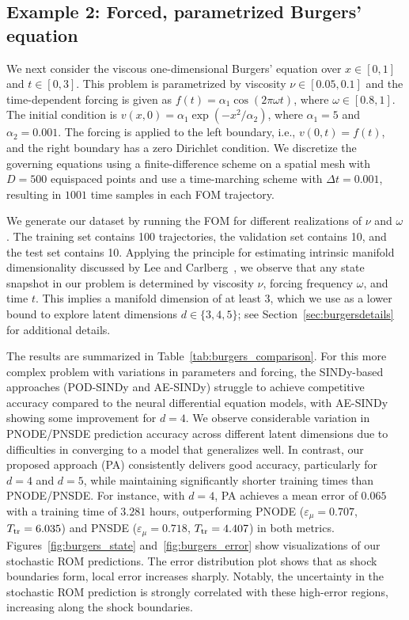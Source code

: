 \documentclass{article}
\begin{document}
	\subsection*{Example 2: Forced, parametrized Burgers' equation}
	
	We next consider the viscous one-dimensional Burgers' equation over $x\in [0, 1]$ and $t\in [0, 3]$. This problem is parametrized by viscosity $\nu \in [0.05,0.1]$ and the time-dependent forcing is given as $f(t) = \alpha_1 \cos(2\pi \omega t)$, where $\omega \in [0.8, 1]$. The initial condition is $v(x, 0) = \alpha_1 \exp (-x^2/\alpha_2)$, where $\alpha_1 = 5$ and $\alpha_2 = 0.001$. The forcing is applied to the left boundary, i.e., $v(0, t) = f(t)$, and the right boundary has a zero Dirichlet condition. We discretize the governing equations using a finite-difference scheme on a spatial mesh with $D=500$ equispaced points and use a time-marching scheme with $\Delta t = 0.001$, resulting in $1001$ time samples in each FOM trajectory.
	
	We generate our dataset by running the FOM for different realizations of $\nu$ and $\omega$. The training set contains 100 trajectories, the validation set contains 10, and the test set contains 10. Applying the principle for estimating intrinsic manifold dimensionality discussed by Lee and Carlberg~\cite{LeeCarlberg2020}, we observe that any state snapshot in our problem is determined by viscosity $\nu$, forcing frequency $\omega$, and time $t$. This implies a manifold dimension of at least 3, which we use as a lower bound to explore latent dimensions $d \in \{3, 4, 5\}$; see Section~\ref{sec:burgersdetails} for additional details.
	
	The results are summarized in Table~\ref{tab:burgers_comparison}. For this more complex problem with variations in parameters and forcing, the SINDy-based approaches (POD-SINDy and AE-SINDy) struggle to achieve competitive accuracy compared to the neural differential equation models, with AE-SINDy showing some improvement for $d=4$. We observe considerable variation in PNODE/PNSDE prediction accuracy across different latent dimensions due to difficulties in converging to a model that generalizes well. In contrast, our proposed approach (PA) consistently delivers good accuracy, particularly for $d=4$ and $d=5$, while maintaining significantly shorter training times than PNODE/PNSDE. For instance, with $d=4$, PA achieves a mean error of $0.065$ with a training time of $3.281$ hours, outperforming PNODE ($\varepsilon_\mu=0.707$, $T_{\rm tr}=6.035$) and PNSDE ($\varepsilon_\mu=0.718$, $T_{\rm tr}=4.407$) in both metrics. Figures~\ref{fig:burgers_state} and~\ref{fig:burgers_error} show visualizations of our stochastic ROM predictions. The error distribution plot shows that as shock boundaries form, local error increases sharply. Notably, the uncertainty in the stochastic ROM prediction is strongly correlated with these high-error regions, increasing along the shock boundaries.
	
\end{document}
